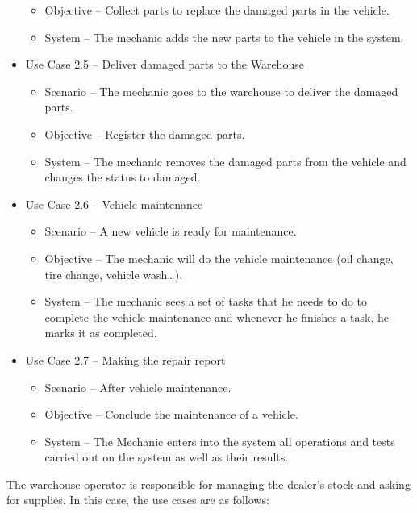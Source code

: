 \begin{itemize}
\begin{itemize}
      \item Objective – Collect parts to replace the damaged parts in the vehicle.
      \item System – The mechanic adds the new parts to the vehicle in the system.
    \end{itemize}
    \item Use Case 2.5 – Deliver damaged parts to the Warehouse
    \begin{itemize}
      \item Scenario – The mechanic goes to the warehouse to deliver the damaged parts.
      \item Objective – Register the damaged parts.
      \item System – The mechanic removes the damaged parts from the vehicle and changes the status to damaged.
    \end{itemize}
\item Use Case 2.6 – Vehicle maintenance
\begin{itemize}
  \item Scenario – A new vehicle is ready for maintenance.
  \item Objective – The mechanic will do the vehicle maintenance (oil change, tire change, vehicle wash…).
  \item System – The mechanic sees a set of tasks that he needs to do to complete the vehicle maintenance and whenever he finishes a task, he marks it as completed.
\end{itemize}
\item Use Case 2.7 – Making the repair report
\begin{itemize}
  \item Scenario – After vehicle maintenance.
  \item Objective – Conclude the maintenance of a vehicle.
  \item System – The Mechanic enters into the system all operations and tests carried out on the system as well as their results.
\end{itemize}
\end{itemize}
\hfill \break

The warehouse operator is responsible for managing the dealer's stock and asking for supplies. 
In this case, the use cases are as follows:

